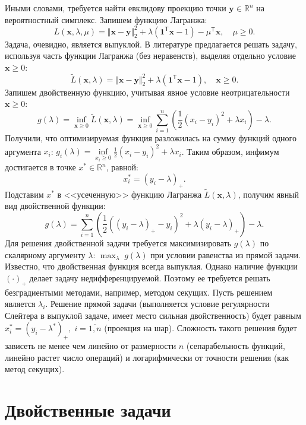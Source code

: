 \documentclass[a4paper,12pt]{article}
\renewcommand{\geq}{\geqslant}
\renewcommand{\top}{\mathsf{T}}
\begin{document}
\begin{enumerate}
	Иными словами, требуется найти евклидову проекцию точки $\mathbf{y} \in \mathbb{R}^n$ на вероятностный симплекс. Запишем функцию Лагранжа:
	$$
	L(\mathbf{x},\lambda,\mu) = \Vert \mathbf{x}-\mathbf{y}\Vert_2^2 +  \lambda(\mathbf{1}^\top\mathbf{x} - 1)  - \mu^\top \mathbf{x},\quad\mu \geq 0.
	$$
	Задача, очевидно, является выпуклой. В литературе предлагается решать задачу, используя часть функции Лагранжа (без неравенств), выделяя отдельно условие $\mathbf{x} \geq 0$:
	$$
	\tilde{L}(\mathbf{x},\lambda) = \Vert \mathbf{x}-\mathbf{y}\Vert_2^2 +  \lambda(\mathbf{1}^\top\mathbf{x} - 1),\quad\mathbf{x} \geq 0.
	$$
	Запишем двойственную функцию, учитывая явное условие неотрицательности $\mathbf{x} \geq 0$:
	$$
	g(\lambda) = \inf\limits_{\mathbf{x} \geq 0} \tilde{L}(\mathbf{x},\lambda) = \inf\limits_{\mathbf{x} \geq 0} \sum\limits_{i=1}^n \left(\frac{1}{2}(x_i - y_i)^2 + \lambda x_i\right) -\lambda.
	$$
	Получили, что оптимизируемая функция разложилась на сумму функций одного аргумента $x_i$: $g_i(\lambda) = \inf\limits_{x_i \geq 0}\frac{1}{2}(x_i - y_i)^2 + \lambda x_i$. Таким образом, инфимум достигается в точке $x^*\in\mathbb{R}^n$, равной:
	$$
	x^*_i = (y_i - \lambda)_{+}.
	$$
	Подставим $x^*$ в <<усеченную>> функцию Лагранжа $\tilde{L}(\mathbf{x},\lambda)$, получим явный вид двойственной функции:
	$$
	g(\lambda) = \sum\limits_{i=1}^n \left(\frac{1}{2}((y_i - \lambda)_{+} - y_i)^2 + \lambda (y_i - \lambda)_{+}\right) -\lambda.
	$$
	Для решения двойственной задачи требуется максимизировать $g(\lambda)$ по скалярному аргументу $\lambda$: $\max_{\lambda}\; g(\lambda)$ при условии равенства из прямой задачи. Известно, что двойственная функция всегда выпуклая. Однако наличие функции $(\cdot)_{+}$ делает задачу недифференцируемой. Поэтому ее требуется решать безградиентыми методами, например, методом секущих. Пусть решением является $\lambda_i$. Решение прямой задачи (выполняется условие регулярности Слейтера в выпуклой задаче, имеет место сильная двойственность) будет равным $x^*_i = (y_i - \lambda^*)_{+},\;i=\overline{1,n}$ (проекция на шар). Сложность такого решения будет зависеть не менее чем линейно от размерности $n$ (сепарабельность функций, линейно растет число операций) и логарифмически от точности решения (как метод секущих).
	
	\end{enumerate}
	
	\section{Двойственные задачи}
	
\end{document}
